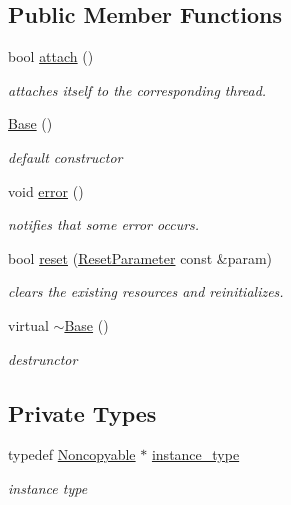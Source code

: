 \subsection*{Public Member Functions}
\begin{DoxyCompactItemize}
\item 
bool \hyperlink{classhryky_1_1task_1_1worker_1_1_base_ae17d5723d8aa5567ea6a47b67f8133c4}{attach} ()
\begin{DoxyCompactList}\small\item\em attaches itself to the corresponding thread. \end{DoxyCompactList}\item 
\hyperlink{classhryky_1_1task_1_1worker_1_1_base_a5ffe0568374d8b9b4c4ec32953fd6453}{Base} ()
\begin{DoxyCompactList}\small\item\em default constructor \end{DoxyCompactList}\item 
\hypertarget{classhryky_1_1task_1_1worker_1_1_base_aa39b31ced492faec5dd3b6478b0a98df}{void \hyperlink{classhryky_1_1task_1_1worker_1_1_base_aa39b31ced492faec5dd3b6478b0a98df}{error} ()}\label{classhryky_1_1task_1_1worker_1_1_base_aa39b31ced492faec5dd3b6478b0a98df}

\begin{DoxyCompactList}\small\item\em notifies that some error occurs. \end{DoxyCompactList}\item 
bool \hyperlink{classhryky_1_1task_1_1worker_1_1_base_a2dfa3093b3165d58ed31aa575ae1b159}{reset} (\hyperlink{structhryky_1_1task_1_1worker_1_1_base_1_1_reset_parameter}{Reset\-Parameter} const \&param)
\begin{DoxyCompactList}\small\item\em clears the existing resources and reinitializes. \end{DoxyCompactList}\item 
virtual \hyperlink{classhryky_1_1task_1_1worker_1_1_base_a722da881b6c70cfcbde9243abcfbf334}{$\sim$\-Base} ()
\begin{DoxyCompactList}\small\item\em destrunctor \end{DoxyCompactList}\end{DoxyCompactItemize}
\subsection*{Private Types}
\begin{DoxyCompactItemize}
\item 
\hypertarget{classhryky_1_1_noncopyable_aaf87abb55f700af85ecb0895f6178821}{typedef \hyperlink{classhryky_1_1_noncopyable}{Noncopyable} $\ast$ \hyperlink{classhryky_1_1_noncopyable_aaf87abb55f700af85ecb0895f6178821}{instance\-\_\-type}}\label{classhryky_1_1_noncopyable_aaf87abb55f700af85ecb0895f6178821}

\begin{DoxyCompactList}\small\item\em instance type \end{DoxyCompactList}\end{DoxyCompactItemize}


